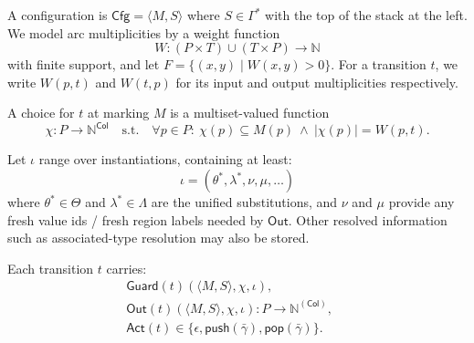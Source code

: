 \documentclass[runningheads]{llncs}
\begin{document}
A configuration is $\mathsf{Cfg}=\langle M,S\rangle$ where $S\in \Gamma^*$ with the top of the stack at the left. We model arc multiplicities by a weight function
\begin{equation*}
     W: (P\times T)\cup (T\times P)\to \mathbb{N}
\end{equation*}
with finite support, and let $F=\{(x,y)\mid W(x,y)>0\}$. For a transition $t$, we write $W(p,t)$ and $W(t,p)$ for its input and output multiplicities respectively.

A choice for $t$ at marking $M$ is a multiset-valued function
\begin{equation*}
    \chi:P\to \mathbb{N}^{\mathsf{Col}}
    \quad\text{s.t.}\quad
    \forall p\in P:\ \chi(p)\subseteq M(p)\ \wedge\ |\chi(p)| = W(p,t). 
\end{equation*}

Let $\iota$ range over instantiations, containing at least:
\begin{equation*}
    \iota=(\theta^{*},\lambda^{*},\nu,\mu,\dots)
\end{equation*}
where $\theta^{*}\in\Theta$ and $\lambda^{*}\in\Lambda$ are the unified substitutions, and $\nu$ and $\mu$ provide any fresh value ids / fresh region labels needed by $\mathsf{Out}$. Other resolved information such as associated-type resolution may also be stored.

Each transition $t$ carries:
\begin{align*}
    & \mathsf{Guard}(t)(\langle M,S\rangle,\chi,\iota),\qquad \\
    & \mathsf{Out}(t)(\langle M,S\rangle,\chi,\iota):P\to \mathbb{N}^{(\mathsf{Col})},\qquad \\
    & \mathsf{Act}(t)\in\{\epsilon,\mathsf{push}(\bar\gamma),\mathsf{pop}(\bar\gamma)\}.
\end{align*}
\end{document}
